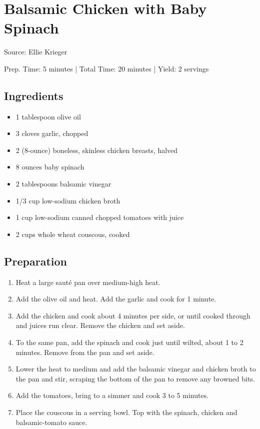 \section{Balsamic Chicken with Baby Spinach}

Source: Ellie Krieger

\begin{center}
Prep. Time: 5 minutes |
Total Time: 20 minutes | 
Yield: 2 servings
\end{center}

\subsection{Ingredients}
\begin{multicols}{2}
\begin{itemize}
    \item 1 tablespoon olive oil
    \item 3 cloves garlic, chopped
    \item 2 (8-ounce) boneless, skinless chicken breasts, halved
    \item 8 ounces baby spinach
    \item 2 tablespoons balsamic vinegar
    \item 1/3 cup low-sodium chicken broth
    \item 1 cup low-sodium canned chopped tomatoes with juice
    \item 2 cups whole wheat couscous, cooked
\end{itemize}
\end{multicols}

\subsection{Preparation}
\begin{enumerate}
    \item Heat a large saut\'{e} pan over medium-high heat.
    \item Add the olive oil and heat. Add the garlic and cook for 1 minute.
    \item Add the chicken and cook about 4 minutes per side, or until cooked through and juices run clear. Remove the chicken and set aside.
    \item To the same pan, add the spinach and cook just until wilted, about 1 to 2 minutes. Remove from the pan and set aside.
    \item Lower the heat to medium and add the balsamic vinegar and chicken broth to the pan and stir, scraping the bottom of the pan to remove any browned bits.
    \item Add the tomatoes, bring to a simmer and cook 3 to 5 minutes.
    \item Place the couscous in a serving bowl. Top with the spinach, chicken and balsamic-tomato sauce.
\end{enumerate}
